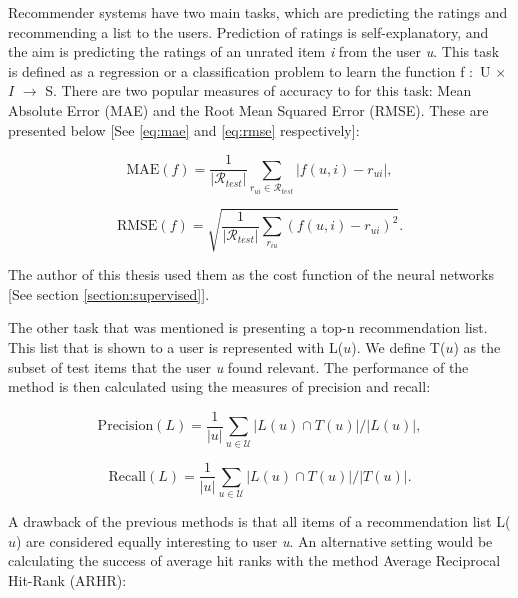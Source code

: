 Recommender systems have two main tasks, which are predicting the ratings and recommending a list to the users. Prediction of ratings is self-explanatory, and the aim is predicting the ratings of an unrated item \textit{i} from the user \textit{u}. This task is defined as a regression or a classification problem to learn the function f $\colon$ U $\times$ $I$ $\rightarrow$ S. There are two popular measures of accuracy to for this task: Mean Absolute Error (MAE) and the Root Mean Squared Error (RMSE). These are presented below [See \eqref{eq:mae} and \eqref{eq:rmse} respectively]:

\begin{equation}
\mathrm { MAE } ( f ) = \frac { 1 } { \left| \mathcal { R } _ {test} \right| } \sum _ { r _ { u i } \in \mathcal { R } _ {test} } \left| f ( u , i ) - r _ { u i } \right| ,
\label{eq:mae}
\end{equation}

\begin{equation}
\mathrm { RMSE } ( f ) = \sqrt { \frac { 1 } { \left| \mathcal { R } _ { test} \right| } \sum _ { r _ { i u } } \left( f ( u , i ) - r _ { u i } \right) ^ { 2 } } .
\label{eq:rmse}
\end{equation}

The author of this thesis used them as the cost function of the neural networks [See section \ref{section:supervised}].


The other task that was mentioned  is presenting a top-n recommendation list. This list that is shown to a user is represented with L($u$). We define T($u$) as the subset of test items that the user \textit{u} found relevant. The performance of the method is then calculated using the measures of precision and recall:

\begin{equation}
\mathrm { Precision } ( L ) = \frac { 1 } { | u | } \sum _ { u \in \mathcal { U } } | L ( u ) \cap T ( u ) | / | L ( u ) | ,
\label{eq:precision}
\end{equation}

\begin{equation}
\mathrm { Recall } ( L ) = \frac { 1 } { | u | } \sum _ { u \in \mathcal { U } } | L ( u ) \cap T ( u ) | / | T ( u ) | .
\label{eq:recall}
\end{equation}

A drawback of the previous methods is that all items of a recommendation list L($u$) are considered equally interesting to user \textit{u}. An alternative setting would be calculating the success of average hit ranks with the method Average Reciprocal Hit-Rank (ARHR):


